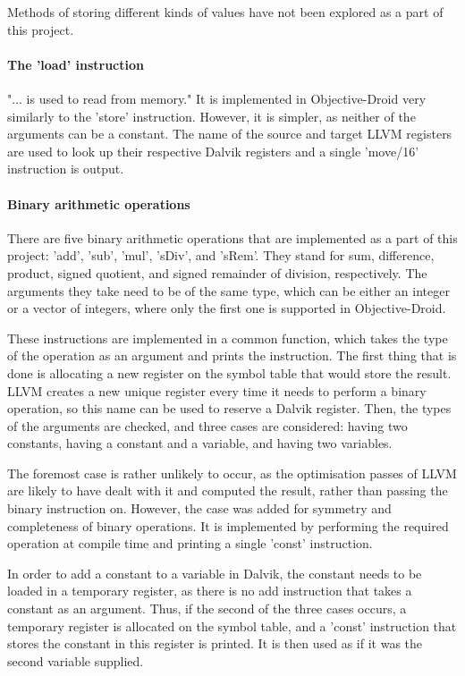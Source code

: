 \documentclass[parskip]{cs4rep}
\begin{document}
Methods of storing different kinds of values have not been explored as a part of this project.

\paragraph{The 'load' instruction} "... is used to read from memory."\cite{P11} It is implemented in Objective-Droid very similarly to the 'store' instruction. However, it is simpler, as neither of the arguments can be a constant. The name of the source and target LLVM registers are used to look up their respective Dalvik registers and a single 'move/16' instruction is output.

\paragraph{Binary arithmetic operations} There are five binary arithmetic operations that are implemented as a part of this project: 'add', 'sub', 'mul', 'sDiv', and 'sRem'. They stand for sum, difference, product, signed quotient, and signed remainder of division, respectively. The arguments they take need to be of the same type, which can be either an integer or a vector of integers, where only the first one is supported in Objective-Droid.

These instructions are implemented in a common function, which takes the type of the operation as an argument and prints the instruction. The first thing that is done is allocating a new register on the symbol table that would store the result. LLVM creates a new unique register every time it needs to perform a binary operation, so this name can be used to reserve a Dalvik register. Then, the types of the arguments are checked, and three cases are considered: having two constants, having a constant and a variable, and having two variables.

The foremost case is rather unlikely to occur, as the optimisation passes of LLVM are likely to have dealt with it and computed the result, rather than passing the binary instruction on. However, the case was added for symmetry and completeness of binary operations. It is implemented by performing the required operation at compile time and printing a single 'const' instruction.

In order to add a constant to a variable in Dalvik, the constant needs to be loaded in a temporary register, as there is no add instruction that takes a constant as an argument. Thus, if the second of the three cases occurs, a temporary register is allocated on the symbol table, and a 'const' instruction that stores the constant in this register is printed. It is then used as if it was the second variable supplied.
\end{document}
